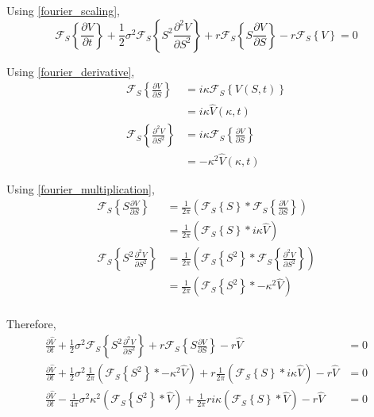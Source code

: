 \noindent
Using \cref{fourier_scaling},
\begin{equation} 
    \mathcal{F}_S \left\{ \frac{\partial V}{\partial t} \right\} + \frac{1}{2}\sigma^2 \mathcal{F}_S \left\{ S^2 \frac{\partial^2 V}{\partial S^2} \right\} + r \mathcal{F}_S \left\{ S\frac{\partial V}{\partial S} \right\} - r \mathcal{F}_S \left\{ V \right\} = 0
\end{equation}

\noindent
Using \cref{fourier_derivative},
\begin{align}
    \mathcal{F}_S \left\{ \frac{\partial V}{\partial S} \right\} &= i \kappa \mathcal{F}_S \left\{ V(S, t) \right\} \\
    &= i \kappa \hat{V}(\kappa, t) \\
    \mathcal{F}_S \left\{ \frac{\partial^2 V}{\partial S^2} \right\} & = i \kappa \mathcal{F}_S \left\{ \frac{\partial V}{\partial S} \right\} \\
    & = -\kappa^2 \hat{V}(\kappa, t)
\end{align}

\noindent
Using \cref{fourier_multiplication},
\begin{align}
    \mathcal{F}_S \left\{ S\frac{\partial V}{\partial S} \right\} &= \frac{1}{2 \pi}( \mathcal{F}_S \left\{ S \right\} * \mathcal{F}_S \left\{ \frac{\partial V}{\partial S} \right\} ) \\
    &= \frac{1}{2 \pi}( \mathcal{F}_S \left\{ S \right\} * i \kappa \hat{V} ) \\
    \mathcal{F}_S \left\{ S^2 \frac{\partial^2 V}{\partial S^2} \right\} &= \frac{1}{2 \pi}( \mathcal{F}_S \left\{ S^2 \right\} * \mathcal{F}_S \left\{ \frac{\partial^2 V}{\partial S^2} \right\} ) \\
    &= \frac{1}{2 \pi}( \mathcal{F}_S \left\{ S^2 \right\} * -\kappa^2 \hat{V} ) \\
\end{align}

\noindent
Therefore,
\begin{align}
    \frac{\partial \hat{V}}{\partial t} + \frac{1}{2}\sigma^2 \mathcal{F}_S \left\{ S^2 \frac{\partial^2 V}{\partial S^2} \right\} + r \mathcal{F}_S \left\{ S\frac{\partial V}{\partial S} \right\} - r \hat{V} &= 0 \\
    \frac{\partial \hat{V}}{\partial t} + \frac{1}{2}\sigma^2 \frac{1}{2 \pi}( \mathcal{F}_S \left\{ S^2 \right\} * -\kappa^2 \hat{V} ) + r \frac{1}{2 \pi}( \mathcal{F}_S \left\{ S \right\} * i \kappa \hat{V} ) - r \hat{V} &= 0 \\
    \frac{\partial \hat{V}}{\partial t} - \frac{1}{4 \pi}\sigma^2 \kappa^2 ( \mathcal{F}_S \left\{ S^2 \right\} * \hat{V} ) + \frac{1}{2 \pi} r i \kappa ( \mathcal{F}_S \left\{ S \right\} * \hat{V} ) - r \hat{V} &= 0
\end{align}

